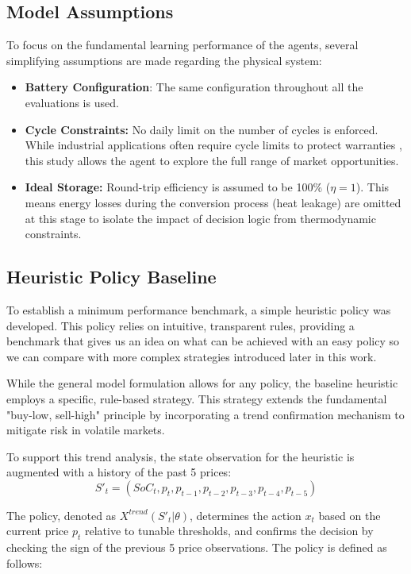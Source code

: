     \subsection{Model Assumptions}
        To focus on the fundamental learning performance of the agents, several simplifying assumptions are made regarding the physical system:
        \begin{itemize}
            \item \textbf{Battery Configuration}: The same configuration throughout all the evaluations is used.
            \item \textbf{Cycle Constraints:} No daily limit on the number of cycles is enforced. While industrial applications often require cycle limits to protect warranties \cite{PLACEHOLDER}, this study allows the agent to explore the full range of market opportunities.
            \item \textbf{Ideal Storage:} Round-trip efficiency is assumed to be 100\% ($ \eta = 1 $). This means energy losses during the conversion process (heat leakage) are omitted at this stage to isolate the impact of decision logic from thermodynamic constraints.
        \end{itemize}

    \subsection{Heuristic Policy Baseline}
        
        To establish a minimum performance benchmark, a simple heuristic policy was developed. This policy relies on intuitive, transparent rules, providing a benchmark that gives us an idea on what can be achieved with an easy policy so we can compare with more complex strategies introduced later in this work.
        
        While the general model formulation allows for any policy, the baseline heuristic employs a specific, rule-based strategy. This strategy extends the fundamental "buy-low, sell-high" principle by incorporating a trend confirmation mechanism to mitigate risk in volatile markets.
        
        To support this trend analysis, the state observation for the heuristic is augmented with a history of the past 5 prices:
        \[
            S'_t = (SoC_t, p_t, p_{t-1}, p_{t-2}, p_{t-3}, p_{t-4}, p_{t-5})
        \]
        
        The policy, denoted as $X^{trend}(S'_t | \theta)$, determines the action $x_t$ based on the current price $p_t$ relative to tunable thresholds, and confirms the decision by checking the sign of the previous 5 price observations. The policy is defined as follows:
        
